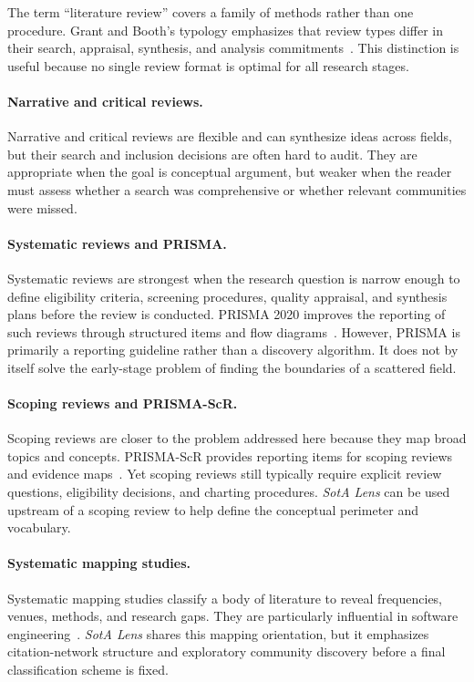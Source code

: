 \documentclass[11pt,a4paper]{article}
\newcommand{\tool}{\emph{SotA Lens}}
\begin{document}
The term ``literature review'' covers a family of methods rather than one procedure. Grant and Booth's typology emphasizes that review types differ in their search, appraisal, synthesis, and analysis commitments~\citep{grant2009typology}. This distinction is useful because no single review format is optimal for all research stages.

\paragraph{Narrative and critical reviews.}
Narrative and critical reviews are flexible and can synthesize ideas across fields, but their search and inclusion decisions are often hard to audit. They are appropriate when the goal is conceptual argument, but weaker when the reader must assess whether a search was comprehensive or whether relevant communities were missed.

\paragraph{Systematic reviews and PRISMA.}
Systematic reviews are strongest when the research question is narrow enough to define eligibility criteria, screening procedures, quality appraisal, and synthesis plans before the review is conducted. PRISMA 2020 improves the reporting of such reviews through structured items and flow diagrams~\citep{page2021prisma,prisma2020web}. However, PRISMA is primarily a reporting guideline rather than a discovery algorithm. It does not by itself solve the early-stage problem of finding the boundaries of a scattered field.

\paragraph{Scoping reviews and PRISMA-ScR.}
Scoping reviews are closer to the problem addressed here because they map broad topics and concepts. PRISMA-ScR provides reporting items for scoping reviews and evidence maps~\citep{tricco2018prisma,prismascrweb}. Yet scoping reviews still typically require explicit review questions, eligibility decisions, and charting procedures. \tool{} can be used upstream of a scoping review to help define the conceptual perimeter and vocabulary.

\paragraph{Systematic mapping studies.}
Systematic mapping studies classify a body of literature to reveal frequencies, venues, methods, and research gaps. They are particularly influential in software engineering~\citep{petersen2015mapping}. \tool{} shares this mapping orientation, but it emphasizes citation-network structure and exploratory community discovery before a final classification scheme is fixed.
\end{document}
